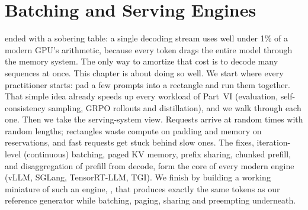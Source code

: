 \chapter{Batching and Serving Engines}\label{ch:serving}

 ended with a sobering table: a single decoding stream uses well under 1\% of a
modern GPU's arithmetic, because every token drags the entire model through the memory system.
The only way to amortize that cost is to decode many sequences at once. This chapter is about
doing so well. We start where every practitioner starts: pad a few prompts into a rectangle and
run them together. That simple idea already speeds up every workload of Part~VI (evaluation,
self-consistency sampling, GRPO rollouts and distillation), and we walk through each one. Then we
take the serving-system view. Requests arrive at random times with random lengths; rectangles waste
compute on padding and memory on reservations, and fast requests get stuck behind slow ones. The
fixes, iteration-level (continuous) batching, paged KV memory, prefix sharing, chunked prefill, and
disaggregation of prefill from decode, form the core of every modern engine (vLLM, SGLang,
TensorRT-LLM, TGI). We finish by building a working miniature of such an engine,
, that produces exactly the same tokens as our reference generator while
batching, paging, sharing and preempting underneath.

